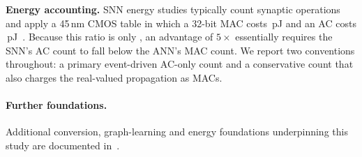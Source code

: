 \textbf{Energy accounting.} SNN energy studies typically count synaptic operations and apply a 45\,nm CMOS table in which a 32-bit MAC costs \MACPJ\,pJ and an AC costs \ACPJ\,pJ~\cite{horowitz2014,eshraghian2023}. Because this ratio is only \MACACRatio, an advantage of $5\times$ essentially requires the SNN's AC count to fall below the ANN's MAC count. We report two conventions throughout: a primary event-driven AC-only count and a conservative count that also charges the real-valued propagation as MACs.

\paragraph{Further foundations.} Additional conversion, graph-learning and energy foundations underpinning this study are documented in~\cite{krizhevsky2009,kugele2020,lecun1998,li2017cifardvs,liu2022spikeconverter,maass1997,orchard2015,zhou2025edge}.
